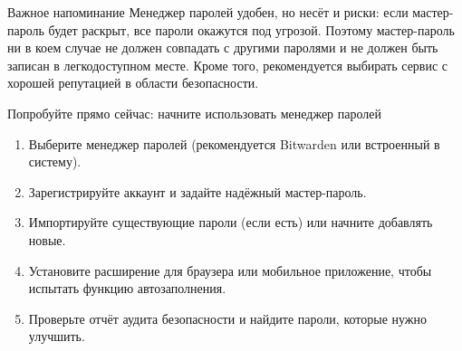 \begin{tcbwarn}{Важное напоминание}
Менеджер паролей удобен, но несёт и риски: если мастер-пароль будет раскрыт, все пароли окажутся под угрозой. Поэтому мастер-пароль ни в коем случае не должен совпадать с другими паролями и не должен быть записан в легкодоступном месте. Кроме того, рекомендуется выбирать сервис с хорошей репутацией в области безопасности.

\end{tcbwarn}

\begin{tcbpractice}{Попробуйте прямо сейчас: начните использовать менеджер паролей}
\begin{enumerate}
  \item Выберите менеджер паролей (рекомендуется Bitwarden или встроенный в систему).
  \item Зарегистрируйте аккаунт и задайте надёжный мастер-пароль.
  \item Импортируйте существующие пароли (если есть) или начните добавлять новые.
  \item Установите расширение для браузера или мобильное приложение, чтобы испытать функцию автозаполнения.
  \item Проверьте отчёт аудита безопасности и найдите пароли, которые нужно улучшить.
\end{enumerate}

\end{tcbpractice}

